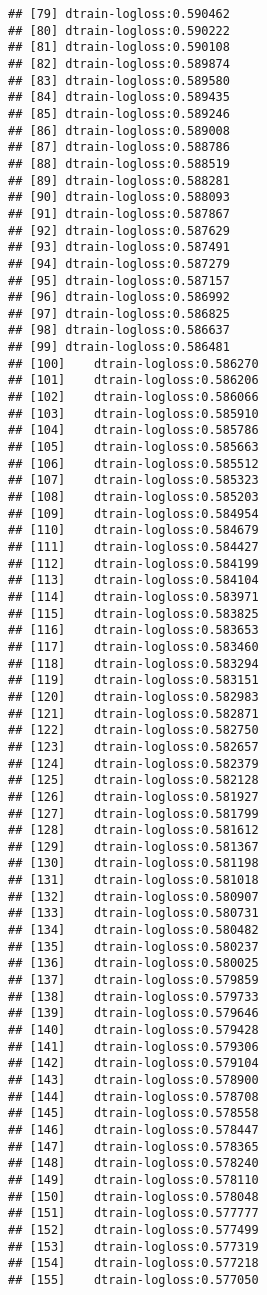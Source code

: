 \documentclass[
]{article}
\begin{document}
\begin{verbatim}
## [79] dtrain-logloss:0.590462 
## [80] dtrain-logloss:0.590222 
## [81] dtrain-logloss:0.590108 
## [82] dtrain-logloss:0.589874 
## [83] dtrain-logloss:0.589580 
## [84] dtrain-logloss:0.589435 
## [85] dtrain-logloss:0.589246 
## [86] dtrain-logloss:0.589008 
## [87] dtrain-logloss:0.588786 
## [88] dtrain-logloss:0.588519 
## [89] dtrain-logloss:0.588281 
## [90] dtrain-logloss:0.588093 
## [91] dtrain-logloss:0.587867 
## [92] dtrain-logloss:0.587629 
## [93] dtrain-logloss:0.587491 
## [94] dtrain-logloss:0.587279 
## [95] dtrain-logloss:0.587157 
## [96] dtrain-logloss:0.586992 
## [97] dtrain-logloss:0.586825 
## [98] dtrain-logloss:0.586637 
## [99] dtrain-logloss:0.586481 
## [100]    dtrain-logloss:0.586270 
## [101]    dtrain-logloss:0.586206 
## [102]    dtrain-logloss:0.586066 
## [103]    dtrain-logloss:0.585910 
## [104]    dtrain-logloss:0.585786 
## [105]    dtrain-logloss:0.585663 
## [106]    dtrain-logloss:0.585512 
## [107]    dtrain-logloss:0.585323 
## [108]    dtrain-logloss:0.585203 
## [109]    dtrain-logloss:0.584954 
## [110]    dtrain-logloss:0.584679 
## [111]    dtrain-logloss:0.584427 
## [112]    dtrain-logloss:0.584199 
## [113]    dtrain-logloss:0.584104 
## [114]    dtrain-logloss:0.583971 
## [115]    dtrain-logloss:0.583825 
## [116]    dtrain-logloss:0.583653 
## [117]    dtrain-logloss:0.583460 
## [118]    dtrain-logloss:0.583294 
## [119]    dtrain-logloss:0.583151 
## [120]    dtrain-logloss:0.582983 
## [121]    dtrain-logloss:0.582871 
## [122]    dtrain-logloss:0.582750 
## [123]    dtrain-logloss:0.582657 
## [124]    dtrain-logloss:0.582379 
## [125]    dtrain-logloss:0.582128 
## [126]    dtrain-logloss:0.581927 
## [127]    dtrain-logloss:0.581799 
## [128]    dtrain-logloss:0.581612 
## [129]    dtrain-logloss:0.581367 
## [130]    dtrain-logloss:0.581198 
## [131]    dtrain-logloss:0.581018 
## [132]    dtrain-logloss:0.580907 
## [133]    dtrain-logloss:0.580731 
## [134]    dtrain-logloss:0.580482 
## [135]    dtrain-logloss:0.580237 
## [136]    dtrain-logloss:0.580025 
## [137]    dtrain-logloss:0.579859 
## [138]    dtrain-logloss:0.579733 
## [139]    dtrain-logloss:0.579646 
## [140]    dtrain-logloss:0.579428 
## [141]    dtrain-logloss:0.579306 
## [142]    dtrain-logloss:0.579104 
## [143]    dtrain-logloss:0.578900 
## [144]    dtrain-logloss:0.578708 
## [145]    dtrain-logloss:0.578558 
## [146]    dtrain-logloss:0.578447 
## [147]    dtrain-logloss:0.578365 
## [148]    dtrain-logloss:0.578240 
## [149]    dtrain-logloss:0.578110 
## [150]    dtrain-logloss:0.578048 
## [151]    dtrain-logloss:0.577777 
## [152]    dtrain-logloss:0.577499 
## [153]    dtrain-logloss:0.577319 
## [154]    dtrain-logloss:0.577218 
## [155]    dtrain-logloss:0.577050
\end{verbatim}
\end{document}
